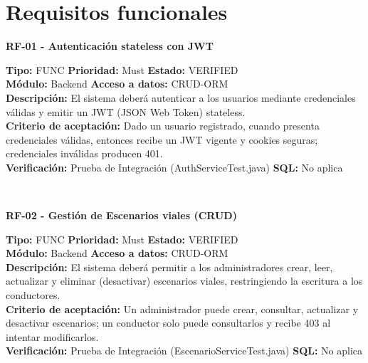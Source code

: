 \documentclass[11pt,a4paper]{article}
\begin{document}
\newpage
\section{Requisitos funcionales}

\newenvironment{requisito}[1]{
    \vspace{0.5cm}
    \noindent\tabularx{\textwidth}{@{}|X|@{}}
    \hline
     \textbf{#1} \\
    \hline
}{
    \\ \hline
    \endtabularx
}

\begin{requisito}{RF-01 - Autenticación stateless con JWT}
    \textbf{Tipo:} FUNC \quad \textbf{Prioridad:} Must \quad \textbf{Estado:} VERIFIED \\[0.2cm]
    \textbf{Módulo:} Backend \quad \textbf{Acceso a datos:} CRUD-ORM \\[0.2cm]
    \textbf{Descripción:} El sistema deberá autenticar a los usuarios mediante credenciales válidas y emitir un JWT (JSON Web Token) stateless. \\[0.2cm]
    \textbf{Criterio de aceptación:} Dado un usuario registrado, cuando presenta credenciales válidas, entonces recibe un JWT vigente y cookies seguras; credenciales inválidas producen 401. \\[0.2cm]
    \textbf{Verificación:} Prueba de Integración (AuthServiceTest.java) \quad \textbf{SQL:} No aplica
\end{requisito}

\begin{requisito}{RF-02 - Gestión de Escenarios viales (CRUD)}
    \textbf{Tipo:} FUNC \quad \textbf{Prioridad:} Must \quad \textbf{Estado:} VERIFIED \\[0.2cm]
    \textbf{Módulo:} Backend \quad \textbf{Acceso a datos:} CRUD-ORM \\[0.2cm]
    \textbf{Descripción:} El sistema deberá permitir a los administradores crear, leer, actualizar y eliminar (desactivar) escenarios viales, restringiendo la escritura a los conductores. \\[0.2cm]
    \textbf{Criterio de aceptación:} Un administrador puede crear, consultar, actualizar y desactivar escenarios; un conductor solo puede consultarlos y recibe 403 al intentar modificarlos. \\[0.2cm]
    \textbf{Verificación:} Prueba de Integración (EscenarioServiceTest.java) \quad \textbf{SQL:} No aplica
\end{requisito}
\end{document}
